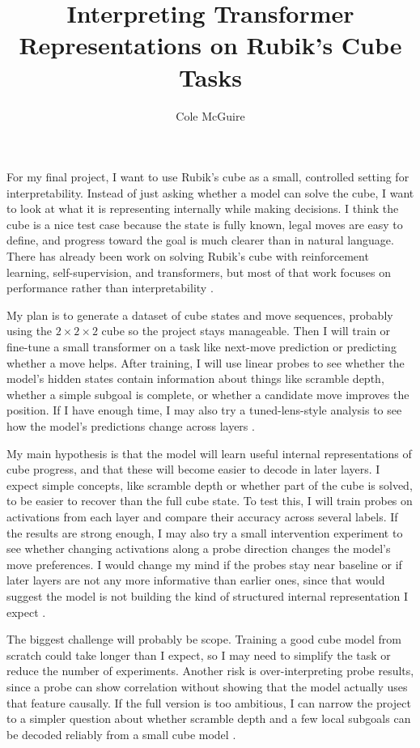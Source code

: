 \documentclass[12pt]{article}
\title{Interpreting Transformer Representations on Rubik's Cube Tasks}
\author{Cole McGuire}
\date{}
\begin{document}
\maketitle

For my final project, I want to use Rubik's cube as a small, controlled setting for interpretability. Instead of just asking whether a model can solve the cube, I want to look at what it is representing internally while making decisions. I think the cube is a nice test case because the state is fully known, legal moves are easy to define, and progress toward the goal is much clearer than in natural language. There has already been work on solving Rubik's cube with reinforcement learning, self-supervision, and transformers, but most of that work focuses on performance rather than interpretability \cite{agostinelli2019deepcubea,takano2021selfsupervision,chasmai2021cubetr}.

My plan is to generate a dataset of cube states and move sequences, probably using the $2\times2\times2$ cube so the project stays manageable. Then I will train or fine-tune a small transformer on a task like next-move prediction or predicting whether a move helps. After training, I will use linear probes to see whether the model's hidden states contain information about things like scramble depth, whether a simple subgoal is complete, or whether a candidate move improves the position. If I have enough time, I may also try a tuned-lens-style analysis to see how the model's predictions change across layers \cite{alain2016probes,belrose2023tunedlens}.

My main hypothesis is that the model will learn useful internal representations of cube progress, and that these will become easier to decode in later layers. I expect simple concepts, like scramble depth or whether part of the cube is solved, to be easier to recover than the full cube state. To test this, I will train probes on activations from each layer and compare their accuracy across several labels. If the results are strong enough, I may also try a small intervention experiment to see whether changing activations along a probe direction changes the model's move preferences. I would change my mind if the probes stay near baseline or if later layers are not any more informative than earlier ones, since that would suggest the model is not building the kind of structured internal representation I expect \cite{alain2016probes,belinkov2022probing}.

The biggest challenge will probably be scope. Training a good cube model from scratch could take longer than I expect, so I may need to simplify the task or reduce the number of experiments. Another risk is over-interpreting probe results, since a probe can show correlation without showing that the model actually uses that feature causally. If the full version is too ambitious, I can narrow the project to a simpler question about whether scramble depth and a few local subgoals can be decoded reliably from a small cube model \cite{belinkov2022probing}.
\end{document}
